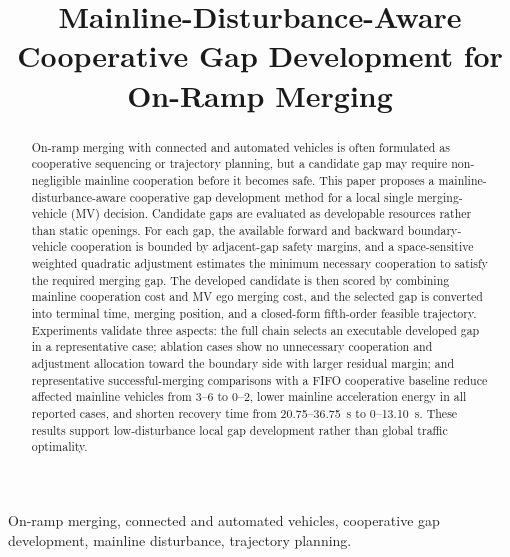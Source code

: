 \documentclass[conference]{IEEEtran}
\begin{document}
\title{Mainline-Disturbance-Aware Cooperative Gap Development for On-Ramp Merging}

\author{
}

\maketitle

\begin{abstract}
On-ramp merging with connected and automated vehicles is often formulated as
cooperative sequencing or trajectory planning, but a candidate gap may require
non-negligible mainline cooperation before it becomes safe. This paper proposes
a mainline-disturbance-aware cooperative gap development method for a local
single merging-vehicle (MV) decision. Candidate gaps are evaluated as
developable resources rather than static openings. For each gap, the available
forward and backward boundary-vehicle cooperation is bounded by adjacent-gap
safety margins, and a space-sensitive weighted quadratic adjustment estimates
the minimum necessary cooperation to satisfy the required merging gap. The
developed candidate is then scored by combining mainline cooperation cost and
MV ego merging cost, and the selected gap is converted into terminal time,
merging position, and a closed-form fifth-order feasible trajectory.
Experiments validate three aspects: the full chain selects an executable
developed gap in a representative case; ablation cases show no unnecessary
cooperation and adjustment allocation toward the boundary side with larger
residual margin; and representative successful-merging comparisons with a FIFO
cooperative baseline reduce affected mainline vehicles from 3--6 to 0--2,
lower mainline acceleration energy in all reported cases, and shorten recovery
time from 20.75--36.75~s to 0--13.10~s. These results support low-disturbance
local gap development rather than global traffic optimality.
\end{abstract}

\begin{IEEEkeywords}
On-ramp merging, connected and automated vehicles, cooperative gap development,
mainline disturbance, trajectory planning.
\end{IEEEkeywords}
\end{document}

